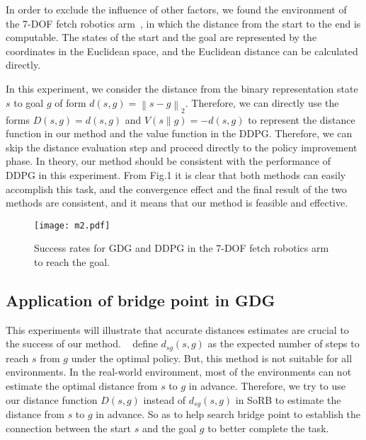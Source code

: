 \documentclass[8pt,twoside,a4paper]{article}
\begin{document}
\par In order to exclude the influence of other factors, we found the environment of the 7-DOF fetch robotics arm~\cite{andrychowicz2017hindsight}, in which the distance from the start to the end is computable. The states of the start and the goal are represented by the coordinates in the Euclidean space, and the Euclidean distance can be calculated directly. 

\par In this experiment, we consider the distance from the binary representation state $s$ to goal $g$ of form $d(s,g)=\left\| s-g \right\|_2$. Therefore, we can directly use the forms $D(s,g)=d(s,g)$ and $V(s\|g)=-d(s,g)$ to represent the distance function in our method and the value function in the DDPG. Therefore, we can skip the distance evaluation step and proceed directly to the policy improvement phase. In theory, our method should be consistent with the performance of DDPG in this experiment. From Fig.1 it is clear that both methods can easily accomplish this task, and the convergence effect and the final result of the two methods are consistent, and it means that our method is feasible and effective.
\begin{figure}[h]
\centering
\texttt{[image: m2.pdf]}
\label{2}
\caption{Success rates for GDG and DDPG in the 7-DOF fetch robotics arm to reach the goal.
}
\end{figure}
\subsection{Application of bridge point in GDG}
This experiments will illustrate that accurate distances estimates are crucial to the success of our method. ~\cite{eysenbach2019search} define $d_{sg}(s, g)$ as the expected number of steps to reach $s$ from $g$ under the optimal policy. But, this method is not suitable for all environments. In the real-world environment, most of the environments can not estimate the optimal distance from $s$ to $g$ in advance. Therefore, we try to use our distance function $D(s,g)$ instead of $d_{sg}(s, g)$ in SoRB to estimate the distance from $s$ to $g$ in advance. So as to help search bridge point to establish the connection between the start $s$ and the goal $g$ to better complete the task. 
\end{document}
